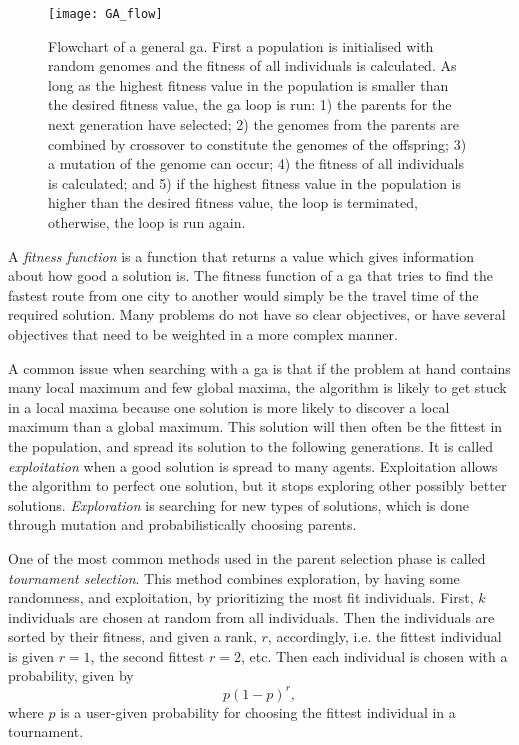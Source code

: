 \begin{figure}[htbp]
    \centering
    \texttt{[image: GA\_flow]}
    \caption[Flowchart of a general \ac{ga}.]{Flowchart of a general \ac{ga}. First a population is initialised with random genomes and the fitness of all individuals is calculated. As long as the highest fitness value in the population is smaller than the desired fitness value, the \ac{ga} loop is run: 1) the parents for the next generation have selected; 2) the genomes from the parents are combined by crossover to constitute the genomes of the offspring; 3) a mutation of the genome can occur; 4) the fitness of all individuals is calculated; and 5) if the highest fitness value in the population is higher than the desired fitness value, the loop is terminated, otherwise, the loop is run again.}
    \label{fig:GA}
\end{figure}

A \textit{fitness function} is a function that returns a value which gives information about how good a solution is. The fitness function of a \ac{ga} that tries to find the fastest route from one city to another would simply be the travel time of the required solution. Many problems do not have so clear objectives, or have several objectives that need to be weighted in a more complex manner.

A common issue when searching with a \ac{ga} is that if the problem at hand contains many local maximum and few global maxima, the algorithm is likely to get stuck in a local maxima because one solution is more likely to discover a local maximum than a global maximum. This solution will then often be the fittest in the population, and spread its solution to the following generations. It is called \textit{exploitation} when a good solution is spread to many agents. Exploitation allows the algorithm to perfect one solution, but it stops exploring other possibly better solutions. \textit{Exploration} is searching for new types of solutions, which is done through mutation and probabilistically choosing parents. 

One of the most common methods used in the parent selection phase is called \textit{tournament selection}. This method combines exploration, by having some randomness, and exploitation, by prioritizing the most fit individuals. First, $k$ individuals are chosen at random from all individuals. Then the individuals are sorted by their fitness, and given a rank, $r$, accordingly, i.e. the fittest individual is given $r=1$, the second fittest $r=2$, etc. Then each individual is chosen with a probability, given by
\begin{equation}
p(1-p)^r,
\end{equation}
where $p$ is a user-given probability for choosing the fittest individual in a tournament. 

